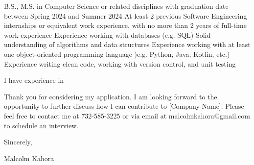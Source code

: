 \documentclass[letterpaper,11pt]{article}
\begin{document}
B.S., M.S. in Computer Science or related disciplines with graduation date between Spring 2024 and Summer 2024
At least 2 previous Software Engineering internships or equivalent work experience, with no more than 2 years of full-time work experience
Experience working with databases (e.g. SQL)
Solid understanding of algorithms and data structures
Experience working with at least one object-oriented programming language )e.g. Python, Java, Kotlin, etc.)
Experience writing clean code, working with version control, and unit testing

 
I have experience in 


\vspace{12pt}
Thank you for considering my application. I am looking forward to the opportunity to further discuss how I can contribute to [Company Name]. Please feel free to contact me at 732-585-3225 or via email at malcolmkahora@gmail.com to schedule an interview.

\vspace{12pt}
Sincerely,

\vspace{50pt}
Malcolm Kahora
\end{document}
